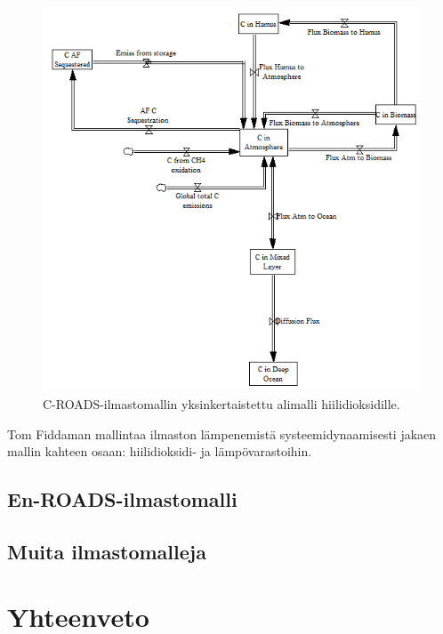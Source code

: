 \documentclass[finnish,12pt,a4paper,pdftex]{article}
\begin{document}
\begin{onehalfspacing}
\begin{figure}[H]
\centering \includegraphics{c-roads-co2}
\caption{C-ROADS-ilmastomallin yksinkertaistettu alimalli hiilidioksidille. \label{ilmasto:co2}}
\end{figure}

Tom Fiddaman mallintaa ilmaston lämpenemistä systeemidynaamisesti jakaen mallin kahteen osaan: hiilidioksidi- ja lämpövarastoihin. 

\subsection{En-ROADS-ilmastomalli \label{ilmasto:enroads}}

\subsection{Muita ilmastomalleja \label{ilmasto:muut}}


\clearpage




\section{Yhteenveto \label{yhteenveto}}

\clearpage

{}



\end{onehalfspacing} %
\end{document}
